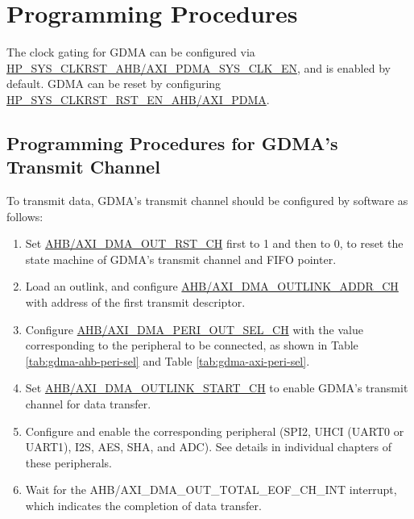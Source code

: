 \documentclass[main\_\_EN.tex]{subfiles}
\begin{document}
\section{Programming Procedures}

The clock gating for GDMA can be configured via \hyperref[fielddesc:HPSYSCLKRSTAHBPDMASYSCLKEN]{HP\_SYS\_CLKRST\_AHB/AXI\_PDMA\_SYS\_CLK\_EN}, and is enabled by default. GDMA can be reset by configuring \hyperref[fielddesc:HPSYSCLKRSTRSTENAHBPDMA]{HP\_SYS\_CLKRST\_RST\_EN\_AHB/AXI\_PDMA}.

\subsection{Programming Procedures for GDMA's Transmit Channel}

To transmit data, GDMA's transmit channel should be configured by software as follows:
\begin{enumerate}
    \item Set \hyperref[fielddesc:AHBDMAOUTRSTCHN]{AHB/AXI\_DMA\_OUT\_RST\_CH} first to 1 and then to 0, to reset the state machine of GDMA's transmit channel and FIFO pointer.
    \item Load an outlink, and configure \hyperref[fielddesc:AHBDMAOUTLINKADDRCHN]{AHB/AXI\_DMA\_OUTLINK\_ADDR\_CH}  with address of the first transmit descriptor.
    \item Configure \hyperref[fielddesc:AHBDMAPERIOUTSELCHN]{AHB/AXI\_DMA\_PERI\_OUT\_SEL\_CH} with the value corresponding to the peripheral to be connected, as shown in Table \ref{tab:gdma-ahb-peri-sel} and Table \ref{tab:gdma-axi-peri-sel}.
    \item Set \hyperref[fielddesc:AHBDMAOUTLINKSTARTCHN]{AHB/AXI\_DMA\_OUTLINK\_START\_CH} to enable GDMA's transmit channel for data transfer.
    \item Configure and enable the corresponding peripheral (SPI2, UHCI (UART0 or UART1), I2S, AES, SHA, and ADC). See details in individual chapters of these peripherals.
    \item Wait for the AHB/AXI\_DMA\_OUT\_TOTAL\_EOF\_CH\_INT interrupt, which indicates the completion of data transfer.
\end{enumerate}
\end{document}
